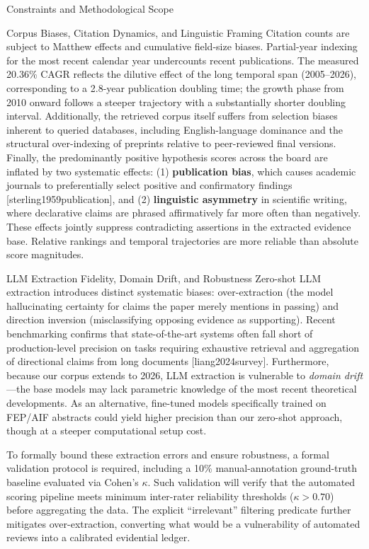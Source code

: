 \documentclass[
  ignorenonframetext,
]{beamer}
\providecommand{\citep}[1]{[#1]}
\begin{document}
\begin{frame}[allowframebreaks]{Constraints and Methodological Scope}
\begin{block}{Corpus Biases, Citation Dynamics, and Linguistic Framing}
\protect{}\label{corpus-biases-citation-dynamics-and-linguistic-framing}
Citation counts are subject to Matthew effects and cumulative field-size
biases. Partial-year indexing for the most recent calendar year
undercounts recent publications. The measured 20.36\% CAGR reflects the
dilutive effect of the long temporal span (2005--2026), corresponding to
a 2.8-year publication doubling time; the growth phase from 2010 onward
follows a steeper trajectory with a substantially shorter doubling
interval. Additionally, the retrieved corpus itself suffers from
selection biases inherent to queried databases, including
English-language dominance and the structural over-indexing of preprints
relative to peer-reviewed final versions. Finally, the predominantly
positive hypothesis scores across the board are inflated by two
systematic effects: (1) \textbf{publication bias}, which causes academic
journals to preferentially select positive and confirmatory findings
\citep{sterling1959publication}, and (2) \textbf{linguistic asymmetry}
in scientific writing, where declarative claims are phrased
affirmatively far more often than negatively. These effects jointly
suppress contradicting assertions in the extracted evidence base.
Relative rankings and temporal trajectories are more reliable than
absolute score magnitudes.
\end{block}

\begin{block}{LLM Extraction Fidelity, Domain Drift, and Robustness}
\protect{}\label{llm-extraction-fidelity-domain-drift-and-robustness}
Zero-shot LLM extraction introduces distinct systematic biases:
over-extraction (the model hallucinating certainty for claims the paper
merely mentions in passing) and direction inversion (misclassifying
opposing evidence as supporting). Recent benchmarking confirms that
state-of-the-art systems often fall short of production-level precision
on tasks requiring exhaustive retrieval and aggregation of directional
claims from long documents \citep{liang2024survey}. Furthermore, because
our corpus extends to 2026, LLM extraction is vulnerable to \emph{domain
drift}---the base models may lack parametric knowledge of the most
recent theoretical developments. As an alternative, fine-tuned models
specifically trained on FEP/AIF abstracts could yield higher precision
than our zero-shot approach, though at a steeper computational setup
cost.

To formally bound these extraction errors and ensure robustness, a
formal validation protocol is required, including a 10\%
manual-annotation ground-truth baseline evaluated via Cohen's
\(\kappa\). Such validation will verify that the automated scoring
pipeline meets minimum inter-rater reliability thresholds
(\(\kappa > 0.70\)) before aggregating the data. The explicit
``irrelevant'' filtering predicate further mitigates over-extraction,
converting what would be a vulnerability of automated reviews into a
calibrated evidential ledger.
\end{block}
\end{frame}
\end{document}
